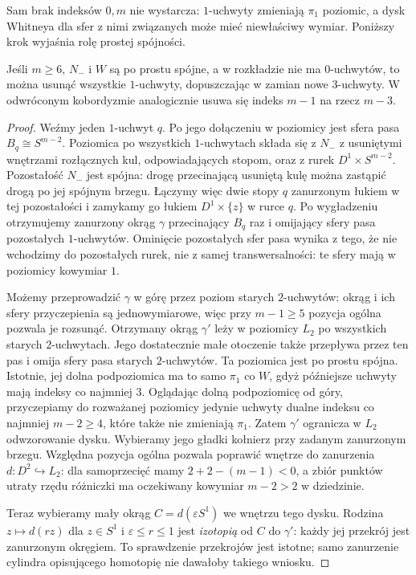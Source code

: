 Sam brak indeksów $0,m$
nie wystarcza: $1$-uchwyty
zmieniają $\pi_1$ poziomic,
a dysk Whitneya dla sfer
z nimi związanych może mieć
niewłaściwy wymiar. Poniższy
krok wyjaśnia rolę prostej
spójności.

\begin{lemat}
\label{lem:handel-trade-hc-19}
Jeśli $m\geq6$, $N_-$ i $W$ są
po prostu spójne, a w rozkładzie
nie ma $0$-uchwytów, to można
usunąć wszystkie $1$-uchwyty,
dopuszczając w zamian nowe
$3$-uchwyty. W odwróconym
kobordyzmie analogicznie
usuwa się indeks $m-1$
na rzecz $m-3$.
\end{lemat}
\begin{proof}
Weźmy jeden $1$-uchwyt $q$.
Po jego dołączeniu w poziomicy
jest sfera pasa $B_q\cong S^{m-2}$.
Poziomica po wszystkich $1$-uchwytach składa się z $N_-$
z usuniętymi wnętrzami rozłącznych kul, odpowiadających stopom,
oraz z rurek $D^1\times S^{m-2}$.
Pozostałość $N_-$ jest spójna: drogę przecinającą usuniętą kulę
można zastąpić drogą po jej spójnym brzegu.
Łączymy więc dwie stopy $q$ zanurzonym łukiem w tej pozostałości
i zamykamy go łukiem $D^1\times\{z\}$ w rurce $q$.
Po wygładzeniu otrzymujemy zanurzony okrąg
$\gamma$ przecinający $B_q$
raz i omijający sfery pasa
pozostałych $1$-uchwytów.
Ominięcie pozostałych sfer pasa wynika z tego, że nie wchodzimy
do pozostałych rurek, nie z samej transwersalności: te sfery mają
w poziomicy kowymiar $1$.

Możemy przeprowadzić $\gamma$
w górę przez poziom starych
$2$-uchwytów: okrąg i ich
sfery przyczepienia są
jednowymiarowe, więc przy
$m-1\geq5$ pozycja ogólna
pozwala je rozsunąć.
Otrzymany okrąg $\gamma'$ leży w poziomicy $L_2$ po wszystkich
starych $2$-uchwytach. Jego dostatecznie małe otoczenie także
przepływa przez ten pas i omija sfery pasa starych $2$-uchwytów.
Ta poziomica jest po prostu
spójna. Istotnie, jej dolna
podpoziomica ma to samo $\pi_1$
co $W$, gdyż późniejsze uchwyty
mają indeksy co najmniej $3$.
Oglądając dolną podpoziomicę
od góry, przyczepiamy do
rozważanej poziomicy jedynie
uchwyty dualne indeksu
co najmniej $m-2\geq4$,
które także nie zmieniają
$\pi_1$. Zatem $\gamma'$ ogranicza w $L_2$ odwzorowanie dysku.
Wybieramy jego gładki kołnierz przy zadanym zanurzonym brzegu.
Względna pozycja ogólna pozwala poprawić wnętrze do zanurzenia
$d:D^2\hookrightarrow L_2$: dla samoprzecięć mamy
$2+2-(m-1)<0$, a zbiór punktów utraty rzędu różniczki ma
oczekiwany kowymiar $m-2>2$ w dziedzinie.

Teraz wybieramy mały okrąg $C=d(\varepsilon S^1)$ we wnętrzu
tego dysku. Rodzina $z\mapsto d(rz)$ dla $z\in S^1$ i
$\varepsilon\leq r\leq1$ jest \emph{izotopią} od $C$ do
$\gamma'$: każdy jej przekrój jest zanurzonym okręgiem.
To sprawdzenie przekrojów jest istotne; samo zanurzenie cylindra
opisującego homotopię nie dawałoby takiego wniosku.


\end{proof}
